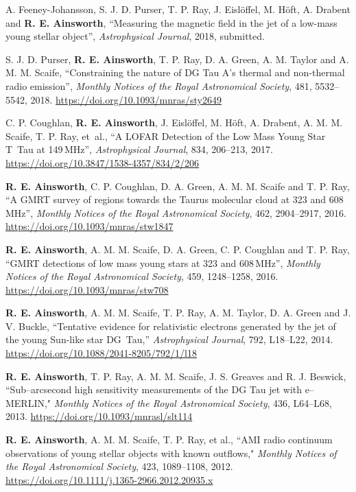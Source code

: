 \begin{cvpubs}
  \cvpub
    {
      \begin{cvetar}
      \item{A. Feeney-Johansson, S. J. D. Purser, T. P. Ray,  J. Eisl{\"o}ffel, M. H{\"o}ft, A. Drabent and \textbf{R. E. Ainsworth}, ``Measuring the magnetic field in the jet of a low-mass young stellar object'', \textit{Astrophysical Journal}, 2018, submitted.}
       \item {S. J. D. Purser, \textbf{R. E. Ainsworth}, T. P. Ray, D. A. Green, A. M. Taylor and A. M. M. Scaife, ``Constraining the nature of DG Tau A's thermal and non-thermal radio emission'', \textit{Monthly Notices of the Royal Astronomical Society}, 481, 5532--5542, 2018. \url{https://doi.org/10.1093/mnras/sty2649}}
        \item {C. P. Coughlan, \textbf{R. E. Ainsworth}, J. Eisl{\"o}ffel, M. H{\"o}ft, A. Drabent, A. M. M. Scaife, T. P. Ray, et~al., ``A LOFAR Detection of the Low Mass Young Star T~Tau at 149\,MHz'', \textit{Astrophysical Journal}, 834, 206--213, 2017. \url{https://doi.org/10.3847/1538-4357/834/2/206}}
        \item {\textbf{R. E. Ainsworth}, C. P. Coughlan, D. A. Green, A. M. M. Scaife and T. P. Ray, ``A GMRT survey of regions towards the Taurus molecular cloud at 323 and 608\,MHz'', \textit{Monthly Notices of the Royal Astronomical Society}, 462, 2904--2917, 2016. \url{https://doi.org/10.1093/mnras/stw1847}}
\item {\textbf{R. E. Ainsworth}, A. M. M. Scaife, D. A. Green, C. P. Coughlan and T. P. Ray, ``GMRT detections of low mass young stars at 323 and 608\,MHz'', \textit{Monthly Notices of the Royal Astronomical Society}, 459, 1248--1258, 2016. \url{https://doi.org/10.1093/mnras/stw708}}
\item {\textbf{R. E. Ainsworth}, A. M. M. Scaife, T. P. Ray, A. M. Taylor, D. A. Green and J. V. Buckle, ``Tentative evidence for relativistic electrons generated by the jet of the young Sun-like star DG~Tau,'' \textit{Astrophysical Journal}, 792, L18--L22, 2014. \url{https://doi.org/10.1088/2041-8205/792/1/l18}}
\item {\textbf{R. E. Ainsworth}, T. P. Ray, A. M. M. Scaife, J. S. Greaves and R. J. Beswick, ``Sub--arcsecond high sensitivity measurements of the DG Tau jet with e--MERLIN," \textit{Monthly Notices of the Royal Astronomical Society}, 436, L64--L68, 2013. \url{https://doi.org/10.1093/mnrasl/slt114}}
\item {\textbf{R. E. Ainsworth}, A. M. M. Scaife, T. P. Ray, et al., ``AMI radio continuum observations of young stellar objects with known outflows," \textit{Monthly Notices of the Royal Astronomical Society}, 423, 1089--1108, 2012. \url{https://doi.org/10.1111/j.1365-2966.2012.20935.x}}

\end{cvetar}}
\end{cvpubs}
